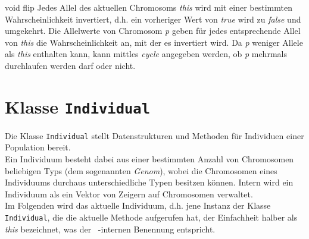\documentclass{report}
\begin{document}
\newpage

\setNormalInstance
\setCorrectWidthThree{8pt}

\printMethodWithParamsSaved
{void}
{}
{flip}
{Jedes Allel des aktuellen Chromosoms {\em this} wird mit einer bestimmten
    Wahrscheinlichkeit invertiert, d.h. ein vorheriger Wert von {\em true} wird 
    zu {\em false} und umgekehrt. Die Allelwerte von Chromosom {\em p} geben f\"ur jedes
    entsprechende Allel von {\em this} die Wahrscheinlichkeit an, mit der es 
    invertiert wird. Da {\em p} weniger Allele als {\em this} enthalten kann,
    kann mittles {\em cycle} angegeben werden, ob {\em p} mehrmals durchlaufen 
    werden darf oder nicht.}
{}
\setCorrectWidthThree{4pt}

\setNormalInstance

\noindent
\chapter{Klasse {\tt Individual}}
Die Klasse {\tt Individual} stellt Datenstrukturen und Methoden f\"ur 
Individuen einer Population bereit.\\
Ein Individuum besteht dabei aus einer bestimmten Anzahl von
Chromosomen beliebigen Typs (dem sogenannten {\em Genom}), wobei die 
Chromosomen eines Individuums durchaus unterschiedliche Typen besitzen 
k\"onnen. Intern wird ein
Individuum als ein Vektor von Zeigern auf Chromosomen verwaltet.\\
Im Folgenden wird das aktuelle Individuum, d.h. jene Instanz der Klasse
{\tt Individual}, die die aktuelle Methode aufgerufen hat, der Einfachheit 
halber als {\em this} bezeichnet, was der \cpp\ -internen Benennung
entspricht.
\end{document}
